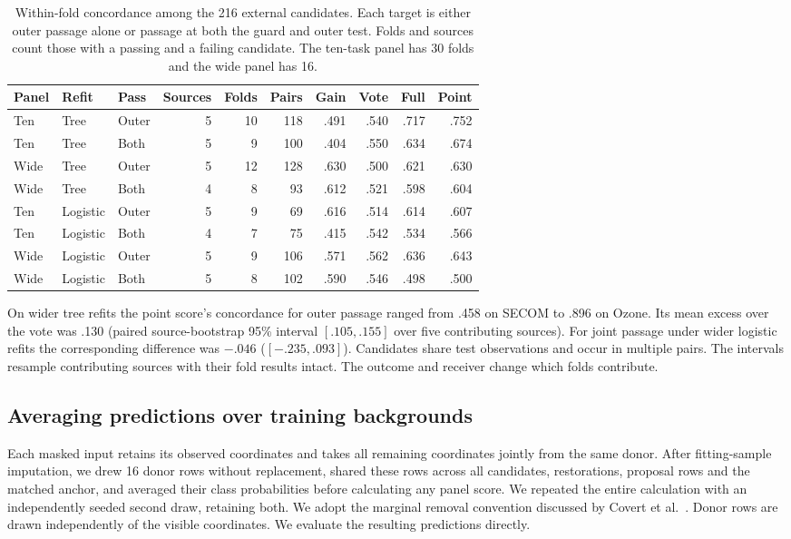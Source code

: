 \begin{table}[htb]
\centering\small
\caption{Within-fold concordance among the 216 external candidates. Each target is either outer passage alone or passage at both the guard and outer test. Folds and sources count those with a passing and a failing candidate. The ten-task panel has 30 folds and the wide panel has 16.}
\label{tab:slate-concordance}
\begin{tabular}{@{}lllrrrrrrr@{}}
\toprule
Panel & Refit & Pass & Sources & Folds & Pairs & Gain & Vote & Full & Point\\
\midrule
Ten & Tree & Outer & 5 & 10 & 118 & .491 & .540 & .717 & .752\\
Ten & Tree & Both & 5 & 9 & 100 & .404 & .550 & .634 & .674\\
Wide & Tree & Outer & 5 & 12 & 128 & .630 & .500 & .621 & .630\\
Wide & Tree & Both & 4 & 8 & 93 & .612 & .521 & .598 & .604\\
Ten & Logistic & Outer & 5 & 9 & 69 & .616 & .514 & .614 & .607\\
Ten & Logistic & Both & 4 & 7 & 75 & .415 & .542 & .534 & .566\\
Wide & Logistic & Outer & 5 & 9 & 106 & .571 & .562 & .636 & .643\\
Wide & Logistic & Both & 5 & 8 & 102 & .590 & .546 & .498 & .500\\
\bottomrule
\end{tabular}
\end{table}

On wider tree refits the point score's concordance for outer passage ranged from .458 on SECOM to .896 on Ozone. Its mean excess over the vote was .130 (paired source-bootstrap 95\% interval $[.105,.155]$ over five contributing sources). For joint passage under wider logistic refits the corresponding difference was $-.046$ ($[-.235,.093]$). Candidates share test observations and occur in multiple pairs. The intervals resample contributing sources with their fold results intact. The outcome and receiver change which folds contribute.

\subsection{Averaging predictions over training backgrounds}
\label{sec:masking-background}
Each masked input retains its observed coordinates and takes all remaining coordinates jointly from the same donor. After fitting-sample imputation, we drew 16 donor rows without replacement, shared these rows across all candidates, restorations, proposal rows and the matched anchor, and averaged their class probabilities before calculating any panel score. We repeated the entire calculation with an independently seeded second draw, retaining both. We adopt the marginal removal convention discussed by Covert et al.~\cite{covert2020sage,covert2021removing}. Donor rows are drawn independently of the visible coordinates. We evaluate the resulting predictions directly.

